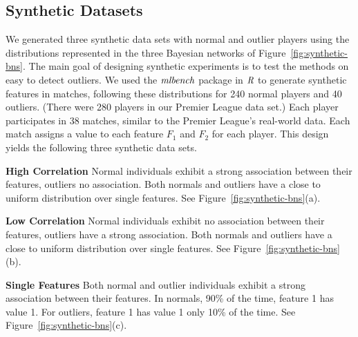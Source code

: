 {	\subsection{Synthetic Datasets}\label{sec:visual}
	We generated three synthetic data sets with normal and outlier players using the distributions represented in the three Bayesian networks of Figure~\ref{fig:synthetic-bns}. The main goal of designing synthetic experiments is to test the methods on  easy to detect outliers. 
	 We used the $\it{mlbench}$ package in $\it{R}$ to generate synthetic features in matches, following these distributions for 240 normal players and 40 outliers. (There were 280 players in our Premier League data set.) Each player participates in 38 matches, similar to the Premier League's real-world data. Each match assigns a value to each feature $F_1$ and $F_{2}$ for each player. This design yields the following three synthetic data sets. 
	\begin{description}
		\item\textbf{High Correlation}  Normal individuals exhibit a strong association between their features, outliers no association. Both normals and outliers have a close to uniform distribution over single features. See Figure~\ref{fig:synthetic-bns}(a).
		\item\textbf{Low Correlation}  Normal individuals exhibit no association between their features, outliers have a strong association. Both normals and outliers have a close to uniform distribution over single features. See Figure~\ref{fig:synthetic-bns}(b).
		\item\textbf{Single Features} Both normal and outlier individuals exhibit a strong association between their features. In normals, 90\% of the time, feature 1 has value 1. For outliers, feature 1 has value 1 only 10\% of the time. See Figure~\ref{fig:synthetic-bns}(c).
	\end{description}
	
	
}
